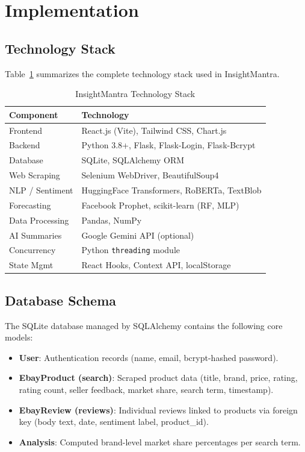 \documentclass[conference]{IEEEtran}
\begin{document}
\section{Implementation}

\subsection{Technology Stack}

Table~\ref{tab:techstack} summarizes the complete technology stack used in InsightMantra.

\begin{table}[htbp]
\caption{InsightMantra Technology Stack}
\begin{center}
\begin{tabular}{p{2.2cm}p{5.3cm}}
\toprule
\textbf{Component} & \textbf{Technology} \\
\midrule
Frontend & React.js (Vite), Tailwind CSS, Chart.js \\
Backend & Python 3.8+, Flask, Flask-Login, Flask-Bcrypt \\
Database & SQLite, SQLAlchemy ORM \\
Web Scraping & Selenium WebDriver, BeautifulSoup4 \\
NLP / Sentiment & HuggingFace Transformers, RoBERTa, TextBlob \\
Forecasting & Facebook Prophet, scikit-learn (RF, MLP) \\
Data Processing & Pandas, NumPy \\
AI Summaries & Google Gemini API (optional) \\
Concurrency & Python \texttt{threading} module \\
State Mgmt & React Hooks, Context API, localStorage \\
\bottomrule
\end{tabular}
\label{tab:techstack}
\end{center}
\end{table}

\subsection{Database Schema}

The SQLite database managed by SQLAlchemy contains the following core models:
\begin{itemize}
    \item \textbf{User}: Authentication records (name, email, bcrypt-hashed password).
    \item \textbf{EbayProduct (search)}: Scraped product data (title, brand, price, rating, rating count, seller feedback, market share, search term, timestamp).
    \item \textbf{EbayReview (reviews)}: Individual reviews linked to products via foreign key (body text, date, sentiment label, product\_id).
    \item \textbf{Analysis}: Computed brand-level market share percentages per search term.
\end{itemize}
\end{document}
